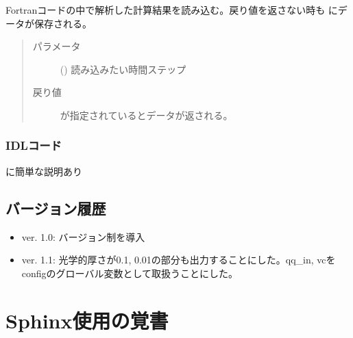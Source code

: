 \documentclass[letterpaper,10pt,dvipdfmx,report]{sphinxmanual}
\begin{document}

\begin{fulllineitems}
\label{\detokenize{io:read_vc}}
Fortranコードの中で解析した計算結果を読み込む。戻り値を返さない時も  にデータが保存される。
\begin{quote}\begin{description}
\item[{パラメータ}] \leavevmode
{} () \sphinxhyphen{}\sphinxhyphen{} 読み込みたい時間ステップ

\item[{戻り値}] \leavevmode
{} が指定されているとデータが返される。

\end{description}\end{quote}

\end{fulllineitems}



\subsection{IDLコード}
\label{\detokenize{io:idl}}
 に簡単な説明あり


\section{バージョン履歴}
\label{\detokenize{io:id6}}\begin{itemize}
\item {} 
ver. 1.0: バージョン制を導入

\item {} 
ver. 1.1: 光学的厚さが0.1, 0.01の部分も出力することにした。qq\_in, vcをconfigのグローバル変数として取扱うことにした。

\end{itemize}


\chapter{Sphinx使用の覚書}
\label{\detokenize{sphinx:sphinx}}\label{\detokenize{sphinx::doc}}
\end{document}
